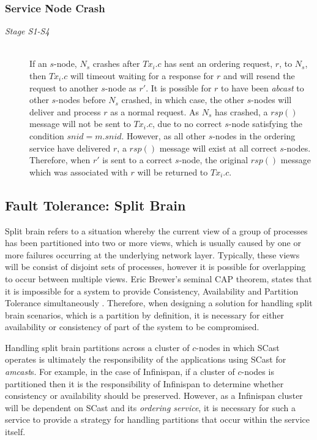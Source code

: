 	\subsubsection*{Service Node Crash}
	\begin{description}
       \item[\emph{Stage S1-S4}] \hfill \\
       If an $s$-node, $N_s$ crashes after $Tx_i.c$ has sent an ordering request, $r$, to $N_s$, then $Tx_i.c$ will timeout waiting for a response for $r$ and will resend the request to another $s$-node as $r'$.    It is possible for $r$ to have been \emph{abcast} to other $s$-nodes before $N_s$ crashed, in which case, the other $s$-nodes will deliver and process $r$ as a normal request.  As $N_s$ has crashed, a $rsp()$ message will not be sent to $Tx_i.c$, due to no correct $s$-node satisfying the condition $snid = m.snid$.  However, as all other $s$-nodes in the ordering service have delivered $r$, a $rsp()$ message will exist at all correct $s$-nodes.  Therefore, when $r'$ is sent to a correct $s$-node, the original $rsp()$ message which was associated with $r$ will be returned to $Tx_i.c$.  
    \end{description}
    
    \subsection{Fault Tolerance: Split Brain}
    Split brain refers to a situation whereby the current view of a group of processes has been partitioned into two or more views, which is usually caused by one or more failures occurring at the underlying network layer. Typically, these views will be consist of disjoint sets of processes, however it is possible for overlapping to occur between multiple views.  Eric Brewer's seminal CAP theorem, states that it is impossible for a system to provide Consistency, Availability and Partition Tolerance simultaneously \citep{Brewer:2000:TRD:343477.343502,6133253, Gilbert:2002:BCF:564585.564601}.  Therefore, when designing a solution for handling split brain scenarios, which is a partition by definition, it is necessary for either availability or consistency of part of the system to be compromised.  
    
    Handling split brain partitions across a cluster of $c$-nodes in which \textsf{SCast} operates is ultimately the responsibility of the applications using \textsf{SCast} for \emph{amcast}s.  For example, in the case of Infinispan, if a cluster of $c$-nodes is partitioned then it is the responsibility of Infinispan to determine whether consistency or availability should be preserved.  However, as a Infinispan cluster will be dependent on \textsf{SCast} and its \emph{ordering service}, it is necessary for such a service to provide a strategy for handling partitions that occur within the service itself.  
    
